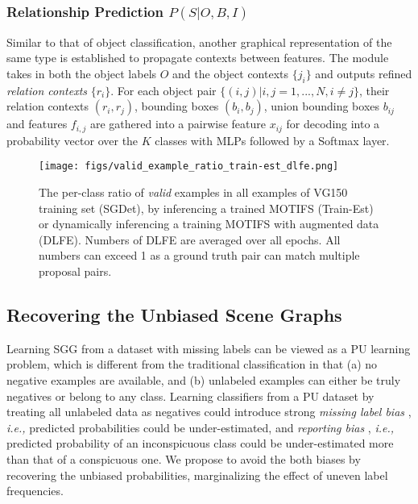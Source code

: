 \documentclass[sigconf]{acmart}
\begin{document}
\subsubsection{Relationship Prediction $P(S|O,B,I)$}
Similar to that of object classification, another graphical representation of the same type is established to propagate contexts between features.
The module takes in both the object labels $O$ and the object contexts $\{j_i\}$ and outputs refined \textit{relation contexts} $\{r_i\}$.
For each object pair $\{(i, j)|i,j=1,...,N, i \neq j\}$, their relation contexts $(r_i, r_j)$, bounding boxes $(b_i, b_j)$, union bounding boxes $b_{ij}$ and features $f_{i,j}$ are gathered into a pairwise feature $x_{ij}$ for decoding into a probability vector over the $K$ classes with MLPs followed by a Softmax layer.

\begin{figure}[t!]
\begin{center}
\texttt{[image: figs/valid\_example\_ratio\_train-est\_dlfe.png]}
\end{center}
\vspace{-1.7em}
  \caption{
  The per-class ratio of \textit{valid} examples in all examples of VG150 training set \cite{xu2017scene} (SGDet), by inferencing a trained MOTIFS (Train-Est) or dynamically inferencing a training MOTIFS with augmented data (DLFE).
  Numbers of DLFE are averaged over all epochs.
  All numbers can exceed 1 as a ground truth pair can match multiple proposal pairs.
}
\label{fig:valid_example_ratio_train-est_dlfe}
\vspace{-1.2em}
\end{figure}

\subsection{Recovering the Unbiased Scene Graphs}
\label{sec:preliminary_on_pu_learning}
Learning SGG from a dataset with missing labels can be viewed as a PU learning problem, which is different from the traditional classification in that (a) no negative examples are available, and (b) unlabeled examples can either be truly negatives or belong to any class.
Learning classifiers from a PU dataset by treating all unlabeled data as negatives could introduce strong \textit{missing label bias} \cite{elkan2008learning}, \emph{i.e.,} predicted probabilities could be under-estimated, and \textit{reporting bias} \cite{misra2016seeing}, \emph{i.e.,} predicted probability of an inconspicuous class could be under-estimated more than that of a conspicuous one.
We propose to avoid the both biases by recovering the unbiased probabilities, marginalizing the effect of uneven label frequencies.
\end{document}
